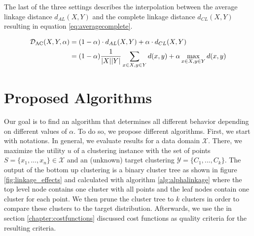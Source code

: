 The last of the three settings describes the interpolation between the average linkage distance $d_{AL}(X,Y)$ and the complete linkage distance $d_{CL}(X,Y)$ resulting in equation \ref{eq:averagecomplete}.

\begin{equation}
    \begin{aligned}
        \mathcal{D}_\text{AC}(X,Y,\alpha) &= (1 - \alpha) \cdot d_{AL}(X,Y) + \alpha \cdot d_{CL}(X,Y)\\
        &= (1 - \alpha) \frac{1}{|X| |Y|}\sum\limits_{x \in X, y \in Y} d(x,y) + \alpha \max\limits_{x \in X, y \in Y} d(x,y)
    \end{aligned}
    \label{eq:averagecomplete}
\end{equation}


\section{Proposed Algorithms}

Our goal is to find an algorithm that determines all different behavior depending on different values of $\alpha$. To do so, we propose different algorithms. First, we start with notations. In general, we evaluate results for a data domain $\mathcal{X}$. There, we maximize the utility $u$ of a clustering instance with the set of points $S = \{x_1, ..., x_n\} \in \mathcal{X}$ and an (unknown) target clustering $\mathcal{Y} = \{C_1, ..., C_k\}$. The output of the bottom up clustering is a binary cluster tree as shown in figure \ref{fig:linkage_effects} and calculated with algorithm \ref{alg:alphalinkage} where the top level node contains one cluster with all points and the leaf nodes contain one cluster for each point. We then prune the cluster tree to $k$ clusters in order to compare these clusters to the target distribution. Afterwards, we use the in section \ref{chapter:costfunctions} discussed cost functions as quality criteria for the resulting criteria.

